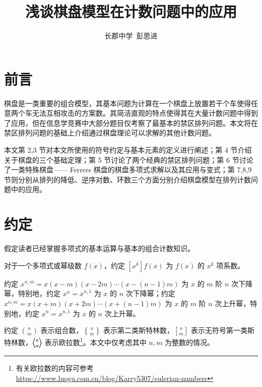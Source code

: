\documentclass{noithesis}
\begin{document}
\setcounter{page}{1}
	\newtheorem{definition}{\hspace{2em}定义}[section]
	\newtheorem{theorem}{\hspace{2em}定理}[section]
	\newtheorem{lemma}{\hspace{2em}引理}[section]
	\newtheorem{problem}{\hspace{2em}例题}[section]
	\title{浅谈棋盘模型在计数问题中的应用}
	\author{长郡中学\ 彭思进}
	\date{}
	
	\maketitle
	
	\def \bangle{ \atopwithdelims \langle \rangle}
	
\section{前言}
	
	棋盘是一类重要的组合模型，其基本问题为计算在一个棋盘上放置若干个车使得任意两个车无法互相攻击的方案数。其简洁直观的特点使得其在大量计数问题中得到了应用，但在信息学竞赛中大部分题目仅考察了最基本的禁区排列问题。本文将在禁区排列问题的基础上介绍通过棋盘理论可以求解的其他计数问题。
	
	本文第 2,3 节对本文所使用的符号约定与基本元素的定义进行阐述；第 4 节介绍关于棋盘的三个基础定理；第 5 节讨论了两个经典的禁区排列问题；第 6 节讨论了一类特殊棋盘—— Ferrers 棋盘的棋盘多项式求解以及其应用与变式；第 7,8,9 节则分别从排列的降低、逆序对数、环数三个方面分别介绍棋盘模型在排列计数问题中的应用。
	
\section{约定}
	
	假定读者已经掌握多项式的基本运算与基本的组合计数知识。
	
	对于一个多项式或幂级数 $f(x)$，约定 $[x^k]f(x)$ 为 $f(x)$ 的 $x^k$ 项系数。
	
	约定 $x^{\underline{n,m}} = x(x-m)(x-2m)\cdots(x-(n-1)m)$ 为 $x$ 的 $m$ 阶 $n$ 次下降幂，特别地，约定 $x^{\underline n} = x^{\underline{n,1}}$ 为 $x$ 的 $n$ 次下降幂；约定 $x^{\overline{n,m}} = x(x+m)(x+2m)\cdots(x+(n-1)m)$ 为 $x$ 的 $m$ 阶 $n$ 次上升幂，特别地，约定 $x^{\overline n} = x^{\overline{n,1}}$ 为 $x$ 的 $n$ 次上升幂。
	
	约定 $n \choose m$ 表示组合数，$n \brace m$ 表示第二类斯特林数，$n \brack m$ 表示无符号第一类斯特林数，$n \bangle m$ 表示欧拉数\footnote{有关欧拉数的内容可参考 \href{https://www.luogu.com.cn/blog/Karry5307/eulerian-numbers}{https://www.luogu.com.cn/blog/Karry5307/eulerian-numbers}}。本文中仅考虑其中 $n,m$ 为整数的情况。
	
\end{document}
